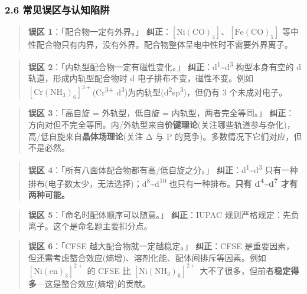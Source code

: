 \subsubsection{2.6 常见误区与认知陷阱}\label{ux5e38ux89c1ux8befux533aux4e0eux8ba4ux77e5ux9677ux9631}

\begin{quote}
\textbf{误区 1}：「配合物一定有外界。」
\textbf{纠正}：\(\mathrm{[Ni(CO)_4]}\)、\(\mathrm{[Fe(CO)_5]}\) 等中性配合物只有内界，没有外界。配合物整体呈电中性时不需要外界离子。
\end{quote}

\begin{quote}
\textbf{误区 2}：「内轨型配合物一定有磁性变化。」
\textbf{纠正}：d\textsuperscript{1}\textasciitilde d\textsuperscript{3} 构型本身有空的 d 轨道，形成内轨型配合物时 d 电子排布不变，磁性不变。例如 \([\mathrm{Cr(NH_3)_6}]^{3+}\)(Cr\textsuperscript{3+} d\textsuperscript{3})为内轨型(d\textsuperscript{2}sp\textsuperscript{3})，但仍有 3 个未成对电子。
\end{quote}

\begin{quote}
\textbf{误区 3}：「高自旋 = 外轨型，低自旋 = 内轨型，两者完全等同。」
\textbf{纠正}：方向对但不完全等同。内/外轨型来自\textbf{价键理论}(关注哪些轨道参与杂化)，高/低自旋来自\textbf{晶体场理论}(关注 Δ 与 P 的竞争)。多数情况下它们对应，但不是必然。
\end{quote}

\begin{quote}
\textbf{误区 4}：「所有八面体配合物都有高/低自旋之分。」
\textbf{纠正}：d\textsuperscript{1}\textasciitilde d\textsuperscript{3} 只有一种排布(电子数太少，无法选择)；d\textsuperscript{8}\textasciitilde d\textsuperscript{10} 也只有一种排布。\textbf{只有 d\textsuperscript{4}\textasciitilde d\textsuperscript{7} 才有两种可能。}
\end{quote}

\begin{quote}
\textbf{误区 5}：「命名时配体顺序可以随意。」
\textbf{纠正}：IUPAC 规则严格规定：先负离子。这个是命名题主要扣分点。
\end{quote}

\begin{quote}
\textbf{误区 6}：「CFSE 越大配合物就一定越稳定。」
\textbf{纠正}：CFSE 是重要因素，但还需考虑螯合效应(熵增)、溶剂化能、配体间排斥等因素。例如 \([\mathrm{Ni(en)_3}]^{2+}\) 的 CFSE 比 \([\mathrm{Ni(NH_3)_6}]^{2+}\) 大不了很多，但前者\textbf{稳定得多}---这是螯合效应(熵增)的贡献。
\end{quote}

